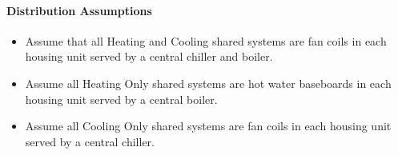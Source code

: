

\paragraph{Distribution Assumptions}
% 
\begin{itemize}
    \item Assume that all Heating and Cooling shared systems are fan coils in each housing unit served by a central chiller and boiler.
    \item Assume all Heating Only shared systems are hot water baseboards in each housing unit served by a central boiler.
    \item Assume all Cooling Only shared systems are fan coils in each housing unit served by a central chiller.
\end{itemize}
